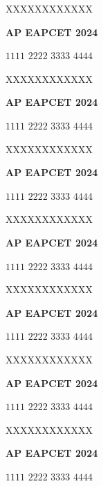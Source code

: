 \documentclass[11pt,paper=a4,answers]{exam}
\begin{document}
\begin{multicols}{2}
\begin{questions}
\question
XXXXXXXXXXXX
\begin{flushright}
\small\textbf{AP EAPCET 2024}
\end{flushright}
\begin{choices}
  \choice $1111$
  \choice $2222$ 
  \choice $3333$ 
  \choice $4444$
\end{choices}

\question
XXXXXXXXXXXX
\begin{flushright}
\small\textbf{AP EAPCET 2024}
\end{flushright}
\begin{choices}
  \choice $1111$
  \choice $2222$ 
  \choice $3333$ 
  \choice $4444$
\end{choices}

\question
XXXXXXXXXXXX
\begin{flushright}
\small\textbf{AP EAPCET 2024}
\end{flushright}
\begin{choices}
  \choice $1111$
  \choice $2222$ 
  \choice $3333$ 
  \choice $4444$
\end{choices}

\question
XXXXXXXXXXXX
\begin{flushright}
\small\textbf{AP EAPCET 2024}
\end{flushright}
\begin{choices}
  \choice $1111$
  \choice $2222$ 
  \choice $3333$ 
  \choice $4444$
\end{choices}

\question
XXXXXXXXXXXX
\begin{flushright}
\small\textbf{AP EAPCET 2024}
\end{flushright}
\begin{choices}
  \choice $1111$
  \choice $2222$ 
  \choice $3333$ 
  \choice $4444$
\end{choices}

\question
XXXXXXXXXXXX
\begin{flushright}
\small\textbf{AP EAPCET 2024}
\end{flushright}
\begin{choices}
  \choice $1111$
  \choice $2222$ 
  \choice $3333$ 
  \choice $4444$
\end{choices}

\question
XXXXXXXXXXXX
\begin{flushright}
\small\textbf{AP EAPCET 2024}
\end{flushright}
\begin{choices}
  \choice $1111$
  \choice $2222$ 
  \choice $3333$ 
  \choice $4444$
\end{choices}


\end{questions}
\end{multicols}
\end{document}
